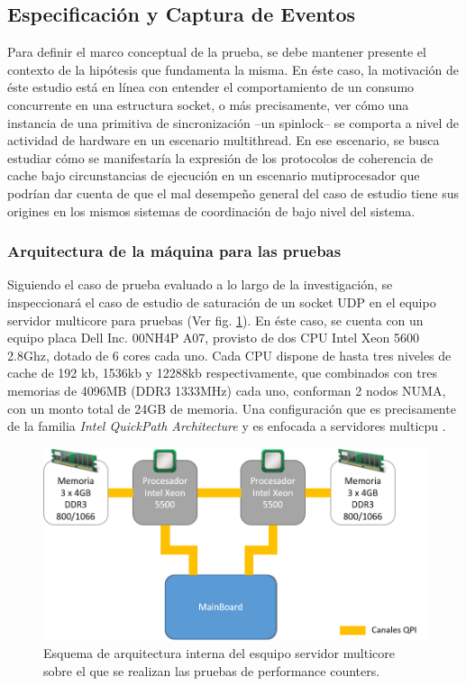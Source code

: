 \subsection{Especificación y Captura de Eventos}
Para definir el marco conceptual de la prueba, se debe mantener presente el contexto de la hipótesis que fundamenta la misma. En éste caso, la motivación de éste estudio está en línea con entender el comportamiento de un consumo concurrente en una estructura socket, o más precisamente, ver cómo una instancia de una primitiva de sincronización --un spinlock-- se comporta a nivel de actividad de hardware en un escenario multithread. En ese escenario, se busca estudiar cómo se manifestaría la expresión de los protocolos de coherencia de cache bajo circunstancias de ejecución en un escenario mutiprocesador que podrían dar cuenta de que el mal desempeño general del caso de estudio tiene sus origines en los mismos sistemas de coordinación de bajo nivel del sistema.

\subsubsection{Arquitectura de la máquina para las pruebas}
Siguiendo el caso de prueba evaluado a lo largo de la investigación, se inspeccionará el caso de estudio de saturación de un socket UDP en el equipo servidor multicore para pruebas (Ver fig. \ref{fig:hwspecs}). En éste caso, se cuenta con un equipo placa Dell Inc. 00NH4P A07, provisto de dos CPU Intel Xeon 5600 2.8Ghz, dotado de 6 cores cada uno. Cada CPU dispone de hasta tres niveles de cache de 192 kb, 1536kb y 12288kb respectivamente, que combinados con tres memorias de 4096MB (DDR3 1333MHz) cada uno, conforman 2 nodos NUMA, con un monto total de 24GB de memoria. Una configuración que es precisamente de la familia \emph{Intel QuickPath Architecture} y es enfocada a servidores multicpu \cite{report:intelxeon5600, manual:intelxeon5600}.

\begin{figure}[!h]
	\centering
	\includegraphics[scale=.7]{imagenes/arch24Cores.png}
	\caption{Esquema de arquitectura interna del esquipo servidor multicore sobre el que se realizan las pruebas de performance counters.}
	\label{fig:hwspecs}
\end{figure}

